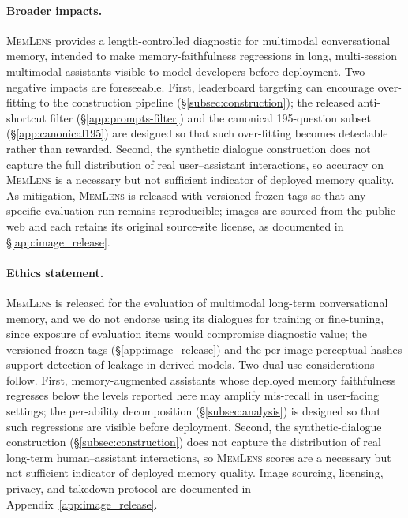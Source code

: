 \documentclass{article}
\newcommand{\bench}{\textsc{MemLens}}
\begin{document}
\paragraph{Broader impacts.}
\label{app:broader_impacts}
\bench{} provides a length-controlled diagnostic for multimodal conversational memory, intended to make memory-faithfulness regressions in long, multi-session multimodal assistants visible to model developers before deployment. Two negative impacts are foreseeable. First, leaderboard targeting can encourage over-fitting to the construction pipeline (\S\ref{subsec:construction}); the released anti-shortcut filter (\S\ref{app:prompts-filter}) and the canonical 195-question subset (\S\ref{app:canonical195}) are designed so that such over-fitting becomes detectable rather than rewarded. Second, the synthetic dialogue construction does not capture the full distribution of real user--assistant interactions, so accuracy on \bench{} is a necessary but not sufficient indicator of deployed memory quality. As mitigation, \bench{} is released with versioned frozen tags so that any specific evaluation run remains reproducible; images are sourced from the public web and each retains its original source-site license, as documented in \S\ref{app:image_release}.

\paragraph{Ethics statement.}
\bench{} is released for the evaluation of multimodal long-term conversational memory, and we do not endorse using its dialogues for training or fine-tuning, since exposure of evaluation items would compromise diagnostic value; the versioned frozen tags (\S\ref{app:image_release}) and the per-image perceptual hashes support detection of leakage in derived models. Two dual-use considerations follow. First, memory-augmented assistants whose deployed memory faithfulness regresses below the levels reported here may amplify mis-recall in user-facing settings; the per-ability decomposition (\S\ref{subsec:analysis}) is designed so that such regressions are visible before deployment. Second, the synthetic-dialogue construction (\S\ref{subsec:construction}) does not capture the distribution of real long-term human--assistant interactions, so \bench{} scores are a necessary but not sufficient indicator of deployed memory quality. Image sourcing, licensing, privacy, and takedown protocol are documented in Appendix~\ref{app:image_release}.
\end{document}
